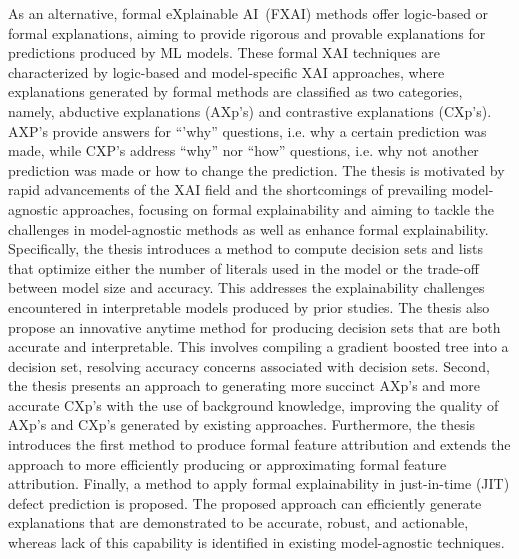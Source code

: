 As an alternative, formal eXplainable AI~(FXAI) methods offer logic-based or formal explanations,
aiming to provide rigorous and provable explanations for predictions produced by ML models.
%
These formal XAI techniques are characterized by logic-based and model-specific XAI approaches,
where explanations generated by formal methods are classified as two categories, namely, abductive explanations (AXp's) and
contrastive explanations (CXp's).
%
AXP's provide answers for ``'why'' questions, i.e. why a certain prediction was made, 
while CXP's address ``why'' nor ``how'' questions, i.e. why not another prediction was made or
how to change the prediction.
%
The thesis is motivated by rapid advancements of the XAI field and the shortcomings 
of prevailing model-agnostic approaches, focusing on formal explainability
and aiming to tackle the challenges in model-agnostic methods as well
as enhance formal explainability.
%
Specifically, the thesis introduces a method to compute decision sets and lists that optimize either 
the number of literals used in the model or the trade-off between model size and accuracy.
%
This addresses the explainability challenges encountered in interpretable models 
produced by prior studies.
%
The thesis also propose an innovative anytime method for producing decision sets
that are both accurate and interpretable.
%
This involves compiling a gradient boosted tree into a decision set, 
resolving accuracy concerns associated with decision sets.
%
Second, the thesis presents an approach to generating more succinct AXp's and more accurate CXp's 
with the use of background knowledge, improving the quality of AXp's and CXp's generated by
existing approaches.
%
Furthermore, the thesis introduces the first method to produce formal feature attribution 
and extends the approach to more efficiently producing or approximating formal feature
attribution.
%
Finally, a method to apply formal explainability in just-in-time (JIT) defect prediction is proposed.
%
The proposed approach can efficiently generate explanations that are demonstrated
to be accurate, robust, and actionable, whereas lack of this capability is 
identified in existing model-agnostic techniques.






% 

